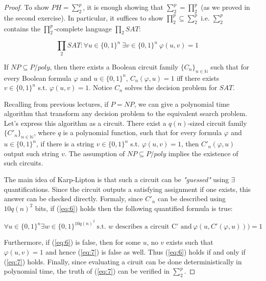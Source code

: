 \documentclass[12pt, a4paper]{article} %
\begin{document}
  \begin{proof}

    To show $PH = \sum_2^p$, it is enough showing that $\sum_2^p = \prod_2^p$ (as we proved in the second exercise).
  In particular, it suffices to show $\prod_2^p \subseteq \sum_2^p$ i.e. $\sum_2^p$ contains the $\prod_2^p$-complete language $\prod_2SAT$:

  \begin{equation}\label{eq:6}
    \prod_2SAT: \forall u \in \{0,1\}^n \ \exists v \in \{0,1\}^n \ \varphi(u,v) = 1
  \end{equation}

  If $NP \subseteq P/poly$, then there exists a Boolean circuit family $\{C_n\}_{n \in \mathbb{N}}$ such that for every Boolean formula $\varphi$ and $u \in \{0,1\}^n$, $C_n(\varphi, u) = 1$ iff there exists $v \in \{0,1\}^n$ s.t. $\varphi(u,v) = 1$. Notice $C_n$ solves the decision problem for $SAT$.

  Recalling from previous lectures, if $P = NP$, we can give a polynomial time algorithm that transform any decision problem to the equivalent search problem.
  Let's express this algorithm as a circuit. There exist a $q(n)$-sized circuit family $\{C'_n\}_{n \in \mathbb{N}}$, where $q$ is a polynomial function, such that for every formula $\varphi$ and $u \in \{0,1\}^n$, if there is a string $v \in \{0,1\}^n$ s.t. $\varphi(u,v) = 1$, then $C'_n(\varphi, u)$ output such string $v$. The assumption of $NP \subseteq P/poly$ implies the existence of such circuits.

  The main idea of Karp-Lipton is that such a circuit can be \textit{"guessed"} using $\exists$ quantifications.
  Since the circuit outputs a satisfying assignment if one exists, this answer can be checked directly.
  Formaly, since $C'_n$ can be described using $10q(n)^2$ bits, if (\ref{eq:6}) holds then the following quantified formula is true:

  \begin{equation}\label{eq:7}
     \forall u \in \{0,1\}^n \exists w \in \{0,1\}^{10q(n)^2} \ \text{s.t. $w$ describes a circuit C' and} \ \varphi(u, C'(\varphi, u))) = 1
  \end{equation}

  Furthermore, if (\ref{eq:6}) is false, then for some $u$, no $v$ exists such that $\varphi(u,v) = 1$ and hence (\ref{eq:7}) is false as well.
  Thus (\ref{eq:6}) holds if and only if (\ref{eq:7}) holds.
  Finally, since evaluating a ciruit can be done deterministically in polynomial time, the truth of (\ref{eq:7}) can be verified in $\sum_2^p$.

  \end{proof}
\end{document}
